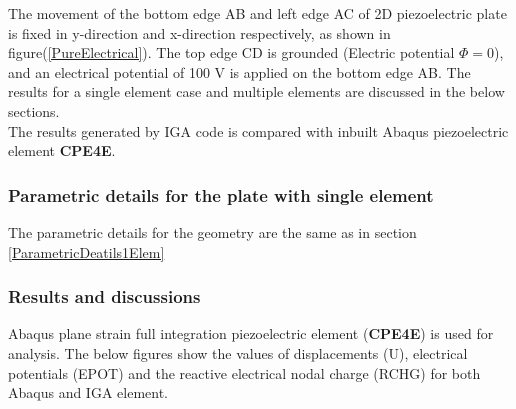 \documentclass[11pt]{article}
\begin{document}
The movement of the bottom edge AB and left edge AC of 2D piezoelectric plate is fixed in y-direction and x-direction respectively, as shown in figure(\ref{PureElectrical}).
The top edge CD is grounded (Electric potential $\Phi = 0$), and an electrical potential of 100 V  is applied on the bottom edge AB. The results for a single element case and multiple elements are discussed in the below
sections. \\
The results generated by IGA code is compared with inbuilt Abaqus piezoelectric
element \textbf{CPE4E}.

\subsubsection{Parametric details for the plate with single element}


The parametric details for the geometry are the same as in section \hyperref[ParametricDeatils1Elem]{\ref{ParametricDeatils1Elem}}

\subsubsection{Results and discussions}
Abaqus plane strain full integration piezoelectric element (\textbf{CPE4E}) is used for analysis. The below figures show the values of displacements (U), electrical potentials (EPOT) and the reactive electrical nodal charge (RCHG) for both Abaqus and IGA element.\\
\end{document}
